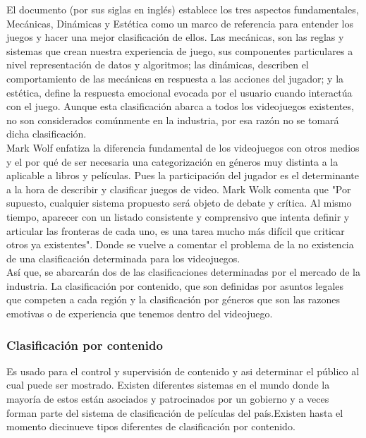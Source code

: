 El documento \cite[MDA]{vid10} (por sus siglas en inglés) establece los tres aspectos fundamentales, Mecánicas, Dinámicas y Estética como un marco de referencia para entender los juegos y hacer una mejor clasificación de ellos. Las mecánicas, son las reglas y sistemas que crean nuestra experiencia de juego, sus componentes particulares a nivel representación de datos y algoritmos; las dinámicas, describen el comportamiento de las mecánicas en respuesta a las acciones del jugador; y la estética, define la respuesta emocional evocada por el usuario cuando interactúa con el juego. Aunque esta clasificación abarca a todos los videojuegos existentes, no son considerados comúnmente en la industria, por esa razón no se tomará dicha clasificación.
\\[1pt]

Mark Wolf\cite{vid11} enfatiza la diferencia fundamental de los videojuegos con otros medios y el por qué de ser necesaria una categorización en géneros muy distinta a la aplicable a libros y películas. Pues la participación del jugador es el determinante a la hora de describir y clasificar juegos de video. Mark Wolk comenta que "Por supuesto, cualquier sistema propuesto será objeto de debate y crítica. Al mismo tiempo, aparecer con un listado consistente y comprensivo que intenta definir y articular las fronteras de cada uno, es una tarea mucho más difícil que criticar otros ya existentes". Donde se vuelve a comentar el problema de la no existencia de una clasificación determinada para los videojuegos.
\\[1pt]

Así que, se abarcarán dos de las clasificaciones determinadas por el mercado de la industria. La clasificación por contenido, que son definidas por asuntos legales que competen a cada región y la clasificación por géneros que son las razones emotivas o de experiencia que tenemos dentro del videojuego.
\\[1pt]

\subsubsection{Clasificación por contenido}

	Es usado para el control y supervisión de contenido y asi determinar el público al cual puede ser mostrado.  Existen diferentes sistemas en el mundo donde la mayoría de estos están asociados y patrocinados por un gobierno y a veces forman parte del sistema de clasificación de películas del país.Existen hasta el momento diecinueve tipos diferentes de clasificación por contenido.\\[1pt]	
	
